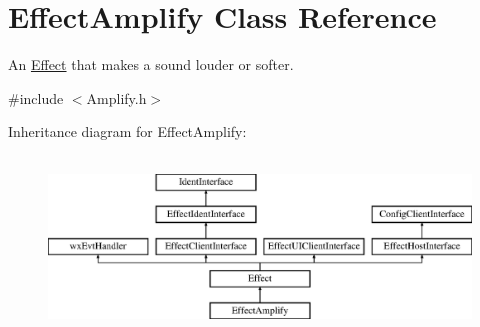 \hypertarget{class_effect_amplify}{}\section{Effect\+Amplify Class Reference}
\label{class_effect_amplify}


An \hyperlink{class_effect}{Effect} that makes a sound louder or softer.  




{\ttfamily \#include $<$Amplify.\+h$>$}

Inheritance diagram for Effect\+Amplify\+:\begin{figure}[H]
\begin{center}
\leavevmode
\includegraphics[height=4.794520cm]{class_effect_amplify}
\end{center}
\end{figure}
